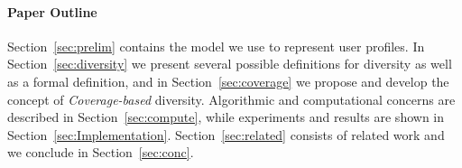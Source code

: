 \paragraph*{Paper Outline} Section~\ref{sec:prelim} contains the model we use to represent user profiles. In Section~\ref{sec:diversity} we present several possible definitions for diversity as well as a formal definition, and in Section~\ref{sec:coverage} we propose and develop the concept of \emph{Coverage-based} diversity. Algorithmic and computational concerns are described in Section~\ref{sec:compute}, while experiments and results are shown in Section~\ref{sec:Implementation}. Section~\ref{sec:related} consists of related work and we conclude in Section~\ref{sec:conc}.